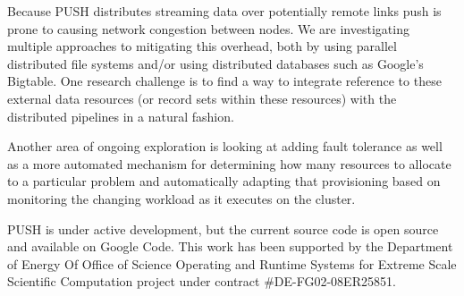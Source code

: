 \documentclass{sig-alt-release2}
\begin{document}
Because PUSH distributes streaming data over potentially remote links push 
is prone to causing network congestion between nodes. 
We are investigating multiple approaches to mitigating this overhead, both
by using parallel distributed file systems and/or using distributed
databases such as Google's Bigtable.
One research challenge is to find a way to integrate reference to these
external data resources (or record sets within these resources) with the
distributed pipelines in a natural fashion.

Another area of ongoing exploration is looking at adding fault tolerance as 
well as a more automated mechanism for determining how many resources to 
allocate to a particular problem and automatically adapting that provisioning 
based on monitoring the changing workload as it executes on the 
cluster.

PUSH is under active development, but the current source code is open source 
and available on Google Code.
This work has been supported by the Department of Energy Of Office of Science Operating and Runtime Systems for Extreme Scale Scientific Computation project under contract \#DE-FG02-08ER25851. 




\end{document}
